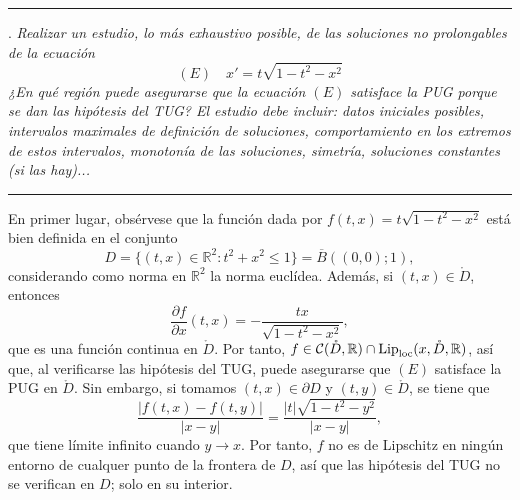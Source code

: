 \documentclass[11pt]{report}
\newcommand{\R}{\mathbb R}
\begin{document}
\vspace{4mm}

\hrule

\vspace{4mm}

. \textit{Realizar un estudio, lo más exhaustivo posible, de las soluciones no prolongables de la ecuación}
\[(E) \quad x'=t\sqrt{1-t^2-x^2}\]
\textit{¿En qué región puede asegurarse que la ecuación $(E)$ satisface la PUG porque se dan las hipótesis del TUG? El estudio debe incluir: datos iniciales posibles, intervalos maximales de definición de soluciones, comportamiento en los extremos de estos intervalos, monotonía de las soluciones, simetría, soluciones constantes (si las hay)...}

\vspace{4mm}

\hrule

\vspace{4mm}

En primer lugar, obsérvese que la función dada por $f(t,x) = t\sqrt{1-t^2-x^2}$ está bien definida en el conjunto
\[D=\{(t,x) \in \R^2 \colon t^2+x^2\leq 1\} = \overline{B}((0,0);1),\]
considerando como norma en $\R^2$ la norma euclídea. Además, si $(t,x) \in \mathring{D}$, entonces
\[\frac{\partial f}{\partial x} (t,x) = -\frac{tx}{\sqrt{1-t^2-x^2}},\]
que es una función continua en $\mathring{D}$. Por tanto, $f \in \mathcal{C}(\mathring{D},\R) \cap \textup{Lip}_{\textup{loc}}(x,\mathring{D},\R)$, así que, al verificarse las hipótesis del TUG, puede asegurarse que $(E)$ satisface la PUG en $\mathring{D}$. Sin embargo, si tomamos $(t,x) \in \partial D$ y $(t,y) \in \mathring{D}$, se tiene que
\[\frac{|f(t,x)-f(t,y)|}{|x-y|}=\frac{|t|\sqrt{1-t^2-y^2}}{|x-y|},\]
que tiene límite infinito cuando $y \to x$. Por tanto, $f$ no es de Lipschitz en ningún entorno de cualquer punto de la frontera de $D$, así que las hipótesis del TUG no se verifican en $D$; solo en su interior.

\vspace{2mm}
\end{document}
